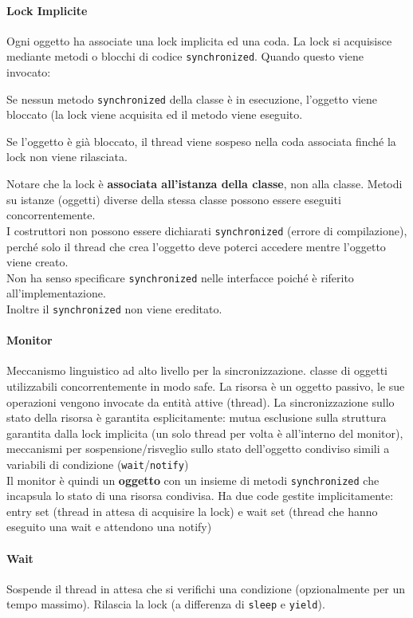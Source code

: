 \documentclass[10pt]{article}
\begin{document}
\paragraph{Lock Implicite} Ogni oggetto ha associate una lock implicita ed una coda. La lock si acquisisce mediante metodi o blocchi di codice \texttt{synchronized}. Quando questo viene invocato:\begin{list}{}{}
	\item Se nessun metodo \texttt{synchronized} della classe è in esecuzione, l'oggetto viene bloccato (la lock viene acquisita ed il metodo viene eseguito.
	\item Se l'oggetto è già bloccato, il thread viene sospeso nella coda associata finché la lock non viene rilasciata.
\end{list}
Notare che la lock è \textbf{associata all'istanza della classe}, non alla classe. Metodi su istanze (oggetti) diverse della stessa classe possono essere eseguiti concorrentemente.\\
I costruttori non possono essere dichiarati \texttt{synchronized} (errore di compilazione), perché solo il thread che crea l'oggetto deve poterci accedere mentre l'oggetto viene creato.\\
Non ha senso specificare \texttt{synchronized} nelle interfacce poiché è riferito all'implementazione.\\
Inoltre il \texttt{synchronized} non viene ereditato.
\paragraph{Monitor} Meccanismo linguistico ad alto livello per la sincronizzazione. classe di oggetti utilizzabili concorrentemente in modo safe. La risorsa è un oggetto passivo, le sue operazioni vengono invocate da entità attive (thread). La sincronizzazione sullo stato della risorsa è garantita esplicitamente: mutua esclusione sulla struttura garantita dalla lock implicita (un solo thread per volta è all'interno del monitor), meccanismi per sospensione/risveglio sullo stato dell'oggetto condiviso simili a variabili di condizione (\texttt{wait}/\texttt{notify})\\
Il monitor è quindi un \textbf{oggetto} con un insieme di metodi \texttt{synchronized} che incapsula lo stato di una risorsa condivisa. Ha due code gestite implicitamente: entry set (thread in attesa di acquisire la lock) e wait set (thread che hanno eseguito una wait e attendono una notify)
\paragraph{Wait} Sospende il thread in attesa che si verifichi una condizione (opzionalmente per un tempo massimo). Rilascia la lock (a differenza di \texttt{sleep} e \texttt{yield}).
\end{document}
